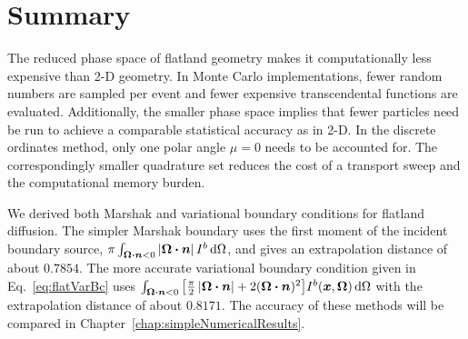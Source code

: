 
\section{Summary}
The reduced phase space of flatland geometry makes it computationally less
expensive than 2-D geometry. In Monte Carlo
implementations, fewer random numbers are sampled per event and fewer expensive
transcendental functions are evaluated. Additionally, the smaller phase space
implies that fewer particles need be run to achieve a comparable statistical
accuracy as in 2-D. In the discrete ordinates method, only one polar angle $\mu=0$
needs to be accounted for. The correspondingly smaller quadrature set reduces
the cost of a transport sweep and the computational memory burden.

We derived both Marshak and variational boundary conditions for flatland
diffusion. The simpler Marshak boundary uses
the first moment of the incident boundary source, $\pi
\int_{\bm{\Omega}\bm{\cdot} \bm{n} < 0 } \left| \bm{\Omega}\bm{\cdot} \bm{n} \right| I^b
\mathop{}\!\mathrm{d}\Omega$, and gives an extrapolation distance of about $0.7854$.
The more accurate variational boundary condition given in
Eq.~\eqref{eq:flatVarBc} uses $\int_{\bm{\Omega}\bm{\cdot}\bm{n} < 0}
\big[ \frac{\pi}{2} \left| \bm{\Omega}\bm{\cdot}\bm{n} \right| + 2 (\bm{\Omega}\bm{\cdot}\bm{n})^2
\big] I^b(\bm{x}, \bm{\Omega}) \mathop{}\!\mathrm{d}\Omega$ with the extrapolation
distance of about $0.8171$. The accuracy of these methods will be compared in
Chapter~\ref{chap:simpleNumericalResults}.

